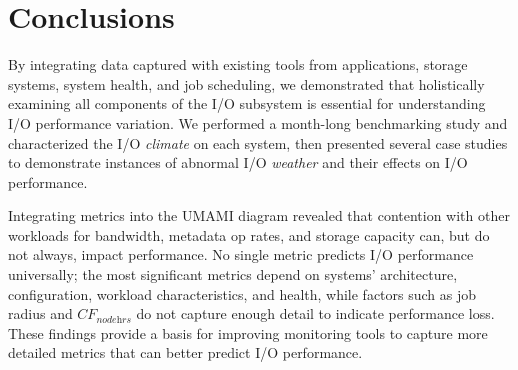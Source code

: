 \section{Conclusions} \label{sec:conclusions}

By integrating data captured with existing tools from applications, storage systems, system health, and job scheduling, we demonstrated that holistically examining all components of the I/O subsystem is essential for understanding I/O performance variation.
We performed a month-long benchmarking study and characterized the I/O \emph{climate} on each system, then presented several case studies to demonstrate instances of abnormal I/O \emph{weather} and their effects on I/O performance.

Integrating metrics into the UMAMI diagram revealed that contention with other workloads for bandwidth, metadata op rates, and storage capacity can, but do not always, impact performance.
No single metric predicts I/O performance universally;
the most significant metrics depend on systems' architecture, configuration, workload characteristics, and health, while 
factors such as job radius and $\textit{CF}_{\textit{nodehrs}}$ do not capture enough detail to indicate performance loss.
These findings provide a basis for improving monitoring tools to capture more detailed metrics that can better predict I/O performance.

